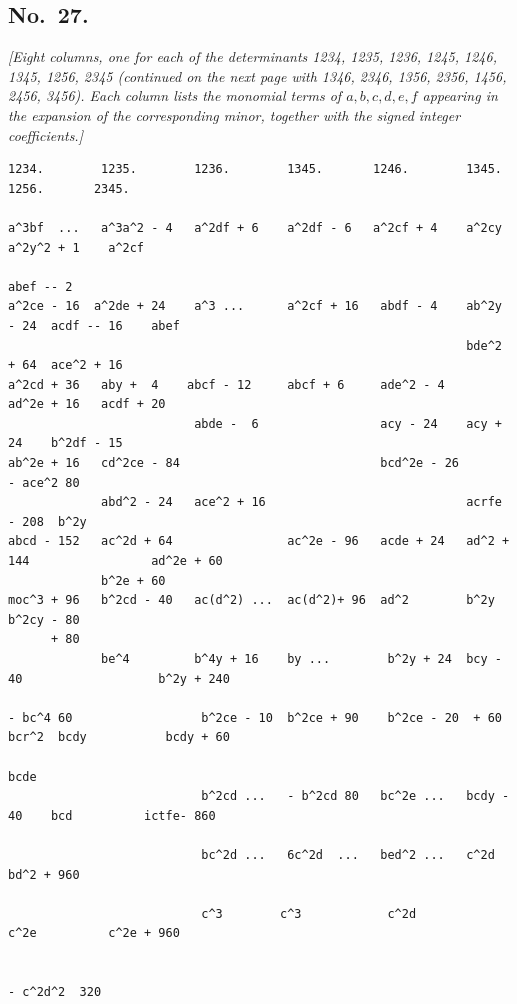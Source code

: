 \documentclass[11pt]{article}
\begin{document}
\bigskip

\subsection*{No.\ 27.}

\textit{[Eight columns, one for each of the determinants 1234, 1235, 1236, 1245, 1246, 1345, 1256, 2345 (continued on the next page with 1346, 2346, 1356, 2356, 1456, 2456, 3456). Each column lists the monomial terms of $a,b,c,d,e,f$ appearing in the expansion of the corresponding minor, together with the signed integer coefficients.]}

\smallskip

\begin{small}
\begin{verbatim}
1234.        1235.        1236.        1345.       1246.        1345.        1256.       2345.

a^3bf  ...   a^3a^2 - 4   a^2df + 6    a^2df - 6   a^2cf + 4    a^2cy      a^2y^2 + 1    a^2cf
                                                                            abef -- 2
a^2ce - 16  a^2de + 24    a^3 ...      a^2cf + 16   abdf - 4    ab^2y - 24  acdf -- 16    abef
                                                                bde^2 + 64  ace^2 + 16
a^2cd + 36   aby +  4    abcf - 12     abcf + 6     ade^2 - 4                ad^2e + 16   acdf + 20
                          abde -  6                 acy - 24    acy + 24    b^2df - 15
ab^2e + 16   cd^2ce - 84                            bcd^2e - 26                            - ace^2 80
             abd^2 - 24   ace^2 + 16                            acrfe - 208  b^2y
abcd - 152   ac^2d + 64                ac^2e - 96   acde + 24   ad^2 + 144                 ad^2e + 60
             b^2e + 60
moc^3 + 96   b^2cd - 40   ac(d^2) ...  ac(d^2)+ 96  ad^2        b^2y                       b^2cy - 80
      + 80
             be^4         b^4y + 16    by ...        b^2y + 24  bcy - 40                   b^2y + 240

- bc^4 60                  b^2ce - 10  b^2ce + 90    b^2ce - 20  + 60 bcr^2  bcdy           bcdy + 60
                                                                              bcde
                           b^2cd ...   - b^2cd 80   bc^2e ...   bcdy - 40    bcd          ictfe- 860

                           bc^2d ...   6c^2d  ...   bed^2 ...   c^2d                       bd^2 + 960

                           c^3        c^3            c^2d                    c^2e          c^2e + 960

                                                                                           - c^2d^2  320
\end{verbatim}
\end{small}
\end{document}
